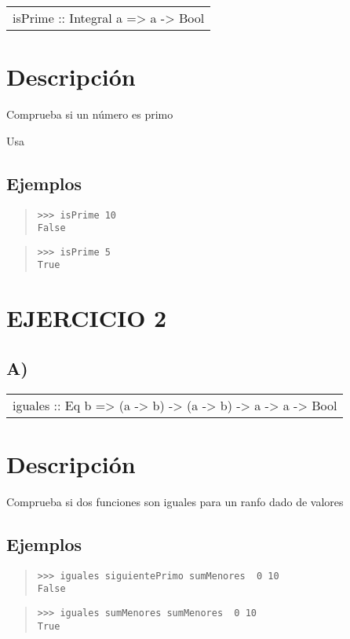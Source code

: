 \begin{haddockdesc}
\item[\begin{tabular}{@{}l}
isPrime :: Integral a => a -> Bool
\end{tabular}]
{\haddockbegindoc
\section*{Descripción}
Comprueba si un número es primo\par
Usa \par
\subsection*{Ejemplos}
\begin{quote}
{\haddockverb\begin{verbatim}
>>> isPrime 10
False

\end{verbatim}}
\end{quote}
\begin{quote}
{\haddockverb\begin{verbatim}
>>> isPrime 5
True

\end{verbatim}}
\end{quote}}
\end{haddockdesc}
\section{EJERCICIO 2}
\subsection{A)}
\begin{haddockdesc}
\item[\begin{tabular}{@{}l}
iguales :: Eq b => (a -> b) -> (a -> b) -> a -> a -> Bool
\end{tabular}]
{\haddockbegindoc
\section*{Descripción}
Comprueba si dos funciones son iguales para un ranfo dado de valores\par
\subsection*{Ejemplos}
\begin{quote}
{\haddockverb\begin{verbatim}
>>> iguales siguientePrimo sumMenores  0 10
False

\end{verbatim}}
\end{quote}
\begin{quote}
{\haddockverb\begin{verbatim}
>>> iguales sumMenores sumMenores  0 10
True

\end{verbatim}}
\end{quote}}
\end{haddockdesc}
